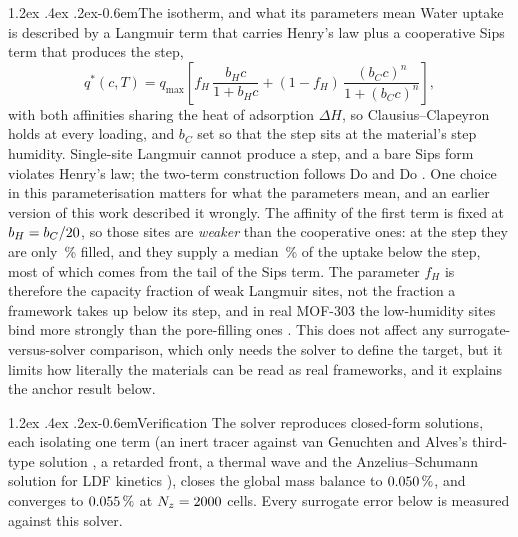 \documentclass[10pt,a4paper]{article}
\makeatletter
\renewcommand\paragraph{\@startsection{paragraph}{4}{\z@}%
  {1.2ex \@plus .4ex \@minus .2ex}{-0.6em}{\normalfont\normalsize\bfseries}}
\makeatother
\begin{document}
\paragraph{The isotherm, and what its parameters mean} Water uptake is described by a
Langmuir term that carries Henry's law plus a cooperative Sips term that produces the
step,
\begin{equation}
q^{*}(c,T) = q_{\max}\left[
f_H\,\frac{b_H c}{1 + b_H c}
+ (1-f_H)\,\frac{(b_C c)^{n}}{1 + (b_C c)^{n}} \right],
\label{eq:isotherm}
\end{equation}
with both affinities sharing the heat of adsorption \(\Delta H\), so Clausius--Clapeyron
holds at every loading, and \(b_C\) set so that the step sits at the material's step
humidity. Single-site Langmuir cannot produce a step, and a bare Sips form violates
Henry's law; the two-term construction follows Do and Do \cite{dodo2000model}. One choice
in this parameterisation matters for what the parameters mean, and an earlier version of
this work described it wrongly. The affinity of the first term is fixed at
\(b_H = b_C/20\), so those sites are \emph{weaker} than the cooperative ones: at the
step they are only \nIbsFill\,\% filled, and they supply a median \nIbsShareMed\,\% of the
uptake below the step, most of which comes from the tail of the Sips term. The parameter
\(f_H\) is therefore the capacity fraction of weak Langmuir sites, not the fraction a
framework takes up below its step, and in real MOF-303 the low-humidity sites bind more
strongly than the pore-filling ones \cite{hanikel2021evolution}. This does not affect any
surrogate-versus-solver comparison, which only needs the solver to define the target, but
it limits how literally the materials can be read as real frameworks, and it explains the
anchor result below.

\paragraph{Verification} The solver reproduces \nLzeroNchecks{} closed-form solutions, each
isolating one term (an inert tracer against van Genuchten and Alves's third-type solution
\cite{vangenuchten1982analytical}, a retarded front, a thermal wave and the
Anzelius--Schumann solution for LDF kinetics \cite{anzelius1926uber,schumann1929heat}),
closes the global mass balance to \(0.050\,\%\), and converges to
\(0.055\,\%\) at \(N_z = 2000\) cells. Every surrogate error below is measured
against this solver.
\end{document}
